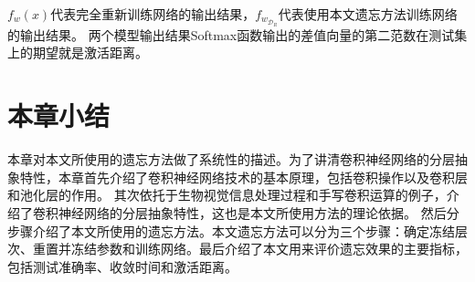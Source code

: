 $f_w(x)$代表完全重新训练网络的输出结果，$f_{w_{\mathcal{D}_R}}$代表使用本文遗忘方法训练网络的输出结果。
两个模型输出结果Softmax函数输出的差值向量的第二范数在测试集上的期望就是激活距离。


\section{本章小结}
本章对本文所使用的遗忘方法做了系统性的描述。为了讲清卷积神经网络的分层抽象特性，本章首先介绍了卷积神经网络技术的基本原理，包括卷积操作以及卷积层和池化层的作用。
其次依托于生物视觉信息处理过程和手写卷积运算的例子，介绍了卷积神经网络的分层抽象特性，这也是本文所使用方法的理论依据。
然后分步骤介绍了本文所使用的遗忘方法。本文遗忘方法可以分为三个步骤：确定冻结层次、重置并冻结参数和训练网络。最后介绍了本文用来评价遗忘效果的主要指标，包括测试准确率、收敛时间和激活距离。
